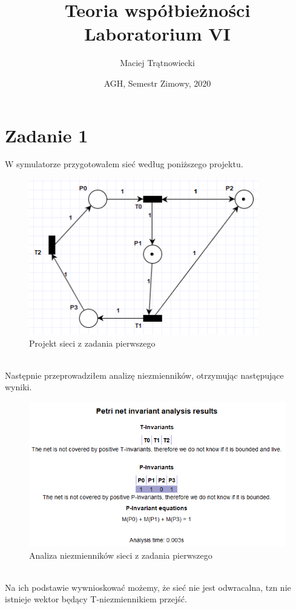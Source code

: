 \documentclass{article}
\title{Teoria współbieżności\\ 
Laboratorium VI}
\author{Maciej Trątnowiecki}
\date{AGH, Semestr Zimowy, 2020}
\begin{document}
    \maketitle
    \section{Zadanie 1}
        W symulatorze przygotowałem sieć według poniższego projektu.
        \begin{figure}[h!]
            \centering
            \includegraphics[width=10cm]{lab6/n1.png}
            \caption{Projekt sieci z zadania pierwszego}
        \end{figure}\\
        Następnie przeprowadziłem analizę niezmienników, otrzymując następujące wyniki.
        \begin{figure}[h!]
            \centering
            \includegraphics[width=14cm]{lab6/n1_1.png}
            \caption{Analiza niezmienników sieci z zadania pierwszego}
        \end{figure}\\
        Na ich podstawie wywnioskować możemy, że sieć nie jest odwracalna, tzn nie istnieje wektor będący T-niezmiennikiem przejść. 
\end{document}
